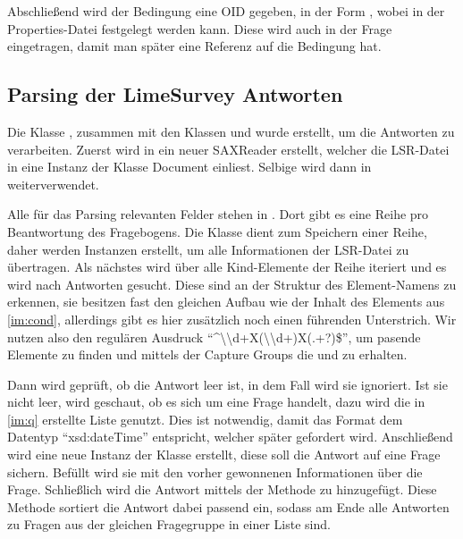 Abschließend wird der Bedingung eine OID gegeben, in der Form , wobei  in der Properties-Datei festgelegt werden kann.
Diese wird auch in der Frage eingetragen, damit man später eine Referenz auf die Bedingung hat.

\subsection{Parsing der LimeSurvey Antworten}
\label{im:ans}

Die Klasse , zusammen mit den Klassen  und  wurde erstellt, um die Antworten zu verarbeiten.
Zuerst wird in  ein neuer SAXReader erstellt, welcher die LSR-Datei in eine Instanz der Klasse Document einliest.
Selbige wird dann in  weiterverwendet.

Alle für das Parsing relevanten Felder stehen in . Dort gibt es eine Reihe pro Beantwortung des Fragebogens.
Die Klasse  dient zum Speichern einer Reihe, daher werden Instanzen erstellt, um alle Informationen der LSR-Datei zu übertragen.
Als nächstes wird über alle Kind-Elemente der Reihe iteriert und es wird nach Antworten gesucht.
Diese sind an der Struktur des Element-Namens zu erkennen, sie besitzen fast den gleichen Aufbau wie der Inhalt des Elements  aus \cref{im:cond}, allerdings gibt es hier zusätzlich noch einen führenden Unterstrich.
Wir nutzen also den regulären Ausdruck \enquote{\textasciicircum\textunderscore\textbackslash\textbackslash d+X(\textbackslash\textbackslash d+)X(.+?)\$}, um pasende Elemente zu finden und mittels der Capture Groups die  und  zu erhalten.

Dann wird geprüft, ob die Antwort leer ist, in dem Fall wird sie ignoriert.
Ist sie nicht leer, wird geschaut, ob es sich um eine  Frage handelt, dazu wird die in \cref{im:q} erstellte Liste genutzt. Dies ist notwendig, damit das Format dem Datentyp \enquote{xsd:dateTime} entspricht, welcher später gefordert wird.
Anschließend wird eine neue Instanz der Klasse  erstellt, diese soll die Antwort auf eine Frage sichern.
Befüllt wird sie mit den vorher gewonnenen Informationen über die Frage.
Schließlich wird die Antwort mittels der Methode  zu  hinzugefügt.
Diese Methode sortiert die Antwort dabei passend ein, sodass am Ende alle Antworten zu Fragen aus der gleichen Fragegruppe in einer Liste sind.

